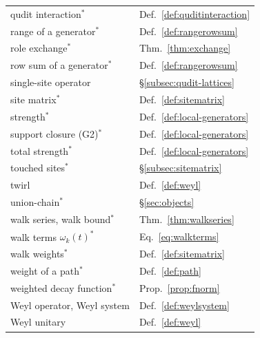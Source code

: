 {\begin{minipage}[t]{0.49\textwidth}
\begin{tabular}[t]{@{}>{\raggedright\arraybackslash}p{}@{\quad}l@{}}
qudit interaction$^*$ & Def.~\ref{def:quditinteraction}\\
range of a generator$^*$ & Def.~\ref{def:rangerowsum}\\
role exchange$^*$ & Thm.~\ref{thm:exchange}\\
row sum of a generator$^*$ & Def.~\ref{def:rangerowsum}\\
single-site operator & \S\ref{subsec:qudit-lattices}\\
site matrix$^*$ & Def.~\ref{def:sitematrix}\\
strength$^*$ & Def.~\ref{def:local-generators}\\
support closure (G2)$^*$ & Def.~\ref{def:local-generators}\\
total strength$^*$ & Def.~\ref{def:local-generators}\\
touched sites$^*$ & \S\ref{subsec:sitematrix}\\
twirl & Def.~\ref{def:weyl}\\
union-chain$^*$ & \S\ref{sec:objects}\\
walk series, walk bound$^*$ & Thm.~\ref{thm:walkseries}\\
walk terms $\omega_k(t)^*$ & Eq.~\eqref{eq:walkterms}\\
walk weights$^*$ & Def.~\ref{def:sitematrix}\\
weight of a path$^*$ & Def.~\ref{def:path}\\
weighted decay function$^*$ & Prop.~\ref{prop:fnorm}\\
Weyl operator, Weyl system & Def.~\ref{def:weylsystem}\\
Weyl unitary & Def.~\ref{def:weyl}\\
\end{tabular}
\end{minipage}}
